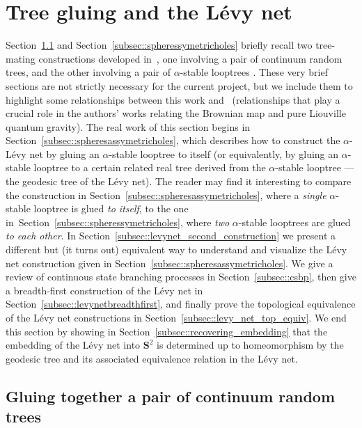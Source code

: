 \documentclass[10pt]{amsart}
\theoremstyle{plain}
\numberwithin{theorem}{section}
\theoremstyle{definition}
\renewcommand{\S}{{\mathbf S}}
\begin{document}
\section{Tree gluing and the Lévy net}
\label{sec::surfacesfromtrees}

Section~\ref{subsec::spheressymetric} and Section~\ref{subsec::spheressymetricholes} briefly recall two tree-mating constructions developed in~\cite{matingtrees}, one involving a pair of continuum random trees, and the other involving a pair of $\alpha$-stable looptrees \cite{ck2013looptrees}. These very brief sections are not strictly necessary for the current project, but we include them to highlight some relationships between this work and~\cite{matingtrees} (relationships that play a crucial role in the authors' works relating the Brownian map and pure Liouville quantum gravity). The real work of this section begins in Section~\ref{subsec::spheresassymetricholes}, which describes how to construct the $\alpha$-Lévy net by gluing an $\alpha$-stable looptree to itself (or equivalently, by gluing an $\alpha$-stable looptree to a certain related real tree derived from the $\alpha$-stable looptree --- the geodesic tree of the Lévy net). The reader may find it interesting to compare the construction in Section~\ref{subsec::spheresassymetricholes}, where a \emph{single} $\alpha$-stable looptree is glued \emph{to itself}, to the one in~Section~\ref{subsec::spheressymetricholes}, where \emph{two} $\alpha$-stable looptrees are glued \emph{to each other}. In Section~\ref{subsec::levynet_second_construction} we present a different but (it turns out) equivalent way to understand and visualize the Lévy net construction given in Section~\ref{subsec::spheresassymetricholes}. We give a review of continuous state branching processes in Section~\ref{subsec::csbp}, then give a breadth-first construction of the Lévy net in Section~\ref{subsec::levynetbreadthfirst}, and finally prove the topological equivalence of the Lévy net constructions in Section~\ref{subsec::levy_net_top_equiv}. We end this section by showing in Section~\ref{subsec::recovering_embedding} that the embedding of the Lévy net into $\S^2$ is determined up to homeomorphism by the geodesic tree and its associated equivalence relation in the Lévy net.

\subsection{Gluing together a pair of continuum random trees}
\label{subsec::spheressymetric}
\end{document}
